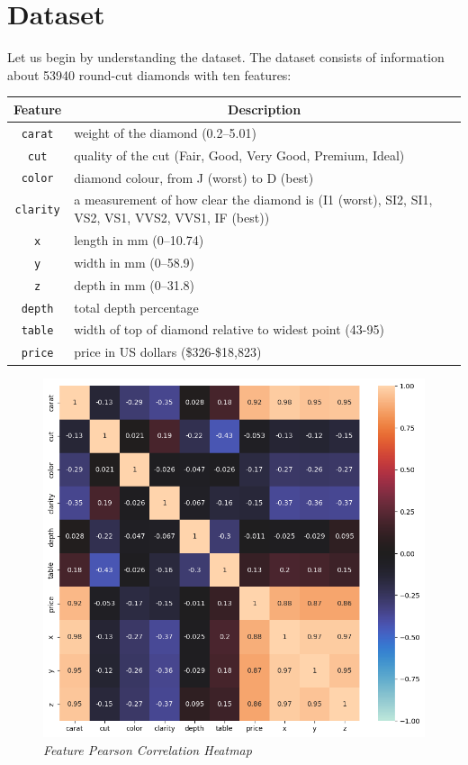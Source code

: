 \documentclass[11pt,letterpaper]{article}
\begin{document}
\section*{Dataset}
Let us begin by understanding the dataset. The dataset consists of information
about 53940 round-cut diamonds with ten features: 
\begin{table}[ht]

\label{table1} 
\begin{tabular}{cl} 
\hline
\multicolumn{1}{c}{Feature} & \multicolumn{1}{c}{Description}\\
\hline 
    \texttt{carat} & weight of the diamond (0.2–5.01) \\
    \texttt{cut} & quality of the cut (Fair, Good, Very Good, Premium, Ideal) \\
    \texttt{color} & diamond colour, from J (worst) to D (best) \\
    \texttt{clarity} & a measurement of how clear the diamond is (I1 (worst),  
    SI2, SI1, VS2, VS1, VVS2, VVS1, IF (best)) \\
    \texttt{x} & length in mm (0–10.74) \\
    \texttt{y} & width in mm (0–58.9) \\
    \texttt{z} & depth in mm (0–31.8) \\
    \texttt{depth} & total depth percentage \\
    \texttt{table} & width of top of diamond relative to widest point (43-95) \\
    \texttt{price} & price in US dollars (\$326-\$18,823)
\end{tabular}
\end{table}
\begin{figure}[H]
    \centering
   \includegraphics[width=0.5\linewidth]{../Figures/Question-1/datasetCorrHeatmap.png}
   \caption{\textit{Feature Pearson Correlation Heatmap}}
   \label{fig:corr_hm}
\end{figure}
\end{document}

